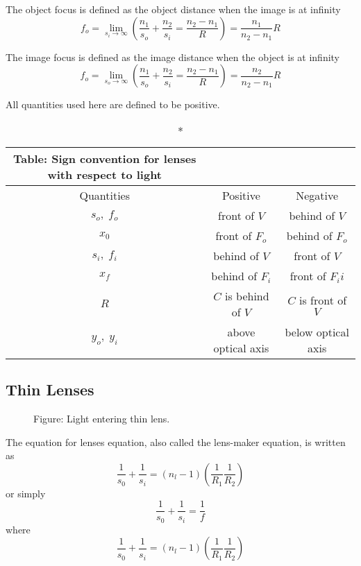 \documentclass[../../../main.tex]{subfiles}
\begin{document}
The object focus is defined as the object distance when the image is at infinity
\begin{equation*}
    f_o=\lim_{s_i\rightarrow\infty}\left(\frac{n_1}{s_o}+\frac{n_2}{s_i}=\frac{n_2-n_1}{R}\right)=\frac{n_1}{n_2-n_1}R
\end{equation*}

The image focus is defined as the image distance when the object is at infinity
\begin{equation*}
    f_o=\lim_{s_o\rightarrow\infty}\left(\frac{n_1}{s_o}+\frac{n_2}{s_i}=\frac{n_2-n_1}{R}\right)=\frac{n_2}{n_2-n_1}R
\end{equation*}

All quantities used here are defined to be positive.
\begin{longtable}{c | c | c}
    \caption*{Table: Sign convention for lenses with respect to light}\\
    \hline
    Quantities & Positive & Negative\\ 
    \hline\hline
    $s_o,\;f_o$& front of $V $ & behind of $V $ \\ 
    $x_0$& front of $F_o $ & behind of $F_o $\\
    $s_i,\;f_i$& behind of $V $ & front of $V $\\
    $x_f$& behind of $F_i $ & front of $F_ii $\\
    $R$& $C$ is behind of $V $ & $C$ is front of $V $\\
    $y_o,\;y_i$& above optical axis &below optical axis\\
    \hline
\end{longtable}

\subsection*{Thin Lenses}
\begin{figure}
    \centering
    \caption*{Figure: Light entering thin lens.}
\end{figure}
The equation for lenses equation, also called the lens-maker equation, is written as 
\begin{equation*}
    \frac{1}{s_0}+\frac{1}{s_i}=(n_l-1)\left(\frac{1}{R_1}\frac{1}{R_2}\right)
\end{equation*}
or simply
\begin{equation*}
    \frac{1}{s_0}+\frac{1}{s_i}=\frac{1}{f}
\end{equation*}
where
\begin{equation*}
    \frac{1}{s_0}+\frac{1}{s_i}=(n_l-1)\left(\frac{1}{R_1}\frac{1}{R_2}\right)
\end{equation*}
\end{document}
